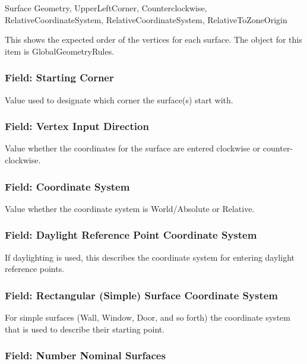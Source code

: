 Surface Geometry, UpperLeftCorner, Counterclockwise, RelativeCoordinateSystem, RelativeCoordinateSystem, RelativeToZoneOrigin

This shows the expected order of the vertices for each surface. The object for this item is GlobalGeometryRules.

\subsubsection{Field: Starting Corner}\label{field-starting-corner}

Value used to designate which corner the surface(s) start with.

\subsubsection{Field: Vertex Input Direction}\label{field-vertex-input-direction}

Value whether the coordinates for the surface are entered clockwise or counter-clockwise.

\subsubsection{Field: Coordinate System}\label{field-coordinate-system}

Value whether the coordinate system is World/Absolute or Relative.

\subsubsection{Field: Daylight Reference Point Coordinate System}\label{field-daylight-reference-point-coordinate-system}

If daylighting is used, this describes the coordinate system for entering daylight reference points.

\subsubsection{Field: Rectangular (Simple) Surface Coordinate System}\label{field-rectangular-simple-surface-coordinate-system}

For simple surfaces (Wall, Window, Door, and so forth) the coordinate system that is used to describe their starting point.

\subsubsection{Field: Number Nominal Surfaces}\label{field-number-nominal-surfaces}

